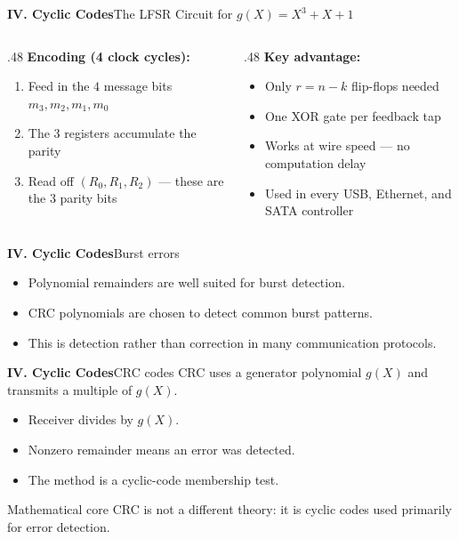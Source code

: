 \begin{frame}{\textbf{IV. Cyclic Codes}}{The LFSR Circuit for $g(X)=X^3+X+1$}
\begin{columns}[T,onlytextwidth]
  \begin{column}{.48\textwidth}
    \textbf{Encoding (4 clock cycles):}
    \begin{enumerate}\small
      \item Feed in the $4$ message bits $m_3,m_2,m_1,m_0$
      \item The 3 registers accumulate the parity
      \item Read off $(R_0, R_1, R_2)$ — these are the 3 parity bits
    \end{enumerate}
  \end{column}
  \begin{column}{.48\textwidth}
    \textbf{Key advantage:}
    \begin{itemize}\small
      \item Only $r = n{-}k$ flip-flops needed
      \item One XOR gate per feedback tap
      \item Works at wire speed — no computation delay
      \item Used in every USB, Ethernet, and SATA controller
    \end{itemize}
  \end{column}
\end{columns}
\end{frame}

\begin{frame}{\textbf{IV. Cyclic Codes}}{Burst errors}
\small
{}
\begin{itemize}
  \item Polynomial remainders are well suited for burst detection.
  \item CRC polynomials are chosen to detect common burst patterns.
  \item This is detection rather than correction in many communication protocols.
\end{itemize}
\end{frame}

\begin{frame}{\textbf{IV. Cyclic Codes}}{CRC codes}
\small
CRC uses a generator polynomial $g(X)$ and transmits a multiple of $g(X)$.
\begin{itemize}
  \item Receiver divides by $g(X)$.
  \item Nonzero remainder means an error was detected.
  \item The method is a cyclic-code membership test.
\end{itemize}
\begin{block}{Mathematical core}
CRC is not a different theory: it is cyclic codes used primarily for error detection.
\end{block}
\end{frame}

